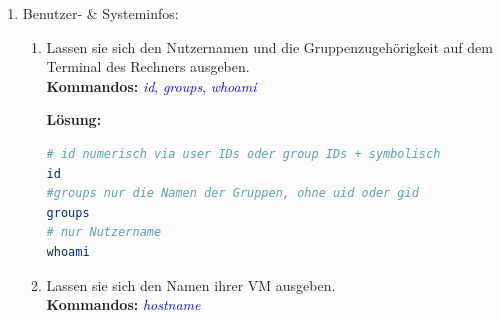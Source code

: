 \documentclass[paper=a4,fontsize=11pt]{scrartcl}%
\numberwithin{equation}{section}
\newenvironment{solution}
	{
		\color{blue}
		\textbf{Lösung:}
	}{}
\begin{document}
\begin{enumerate}
\begin{enumerate}[label=(\alph*)]
		\begin{solution}
        \begin{lstlisting}[style=Bash, language=Bash]
cd
mkdir -p exercise_notes/tutorials
		\end{lstlisting}
		\end{solution}
		\item Kopieren sie die Datei bzw. den Ordner \emph{shell\_tutorial} in das eben angelegte Verzeichnis.\\
		\textbf{Kommandos:} \textcolor{blue}{\emph{cp} }
		
		\begin{solution}
        \begin{lstlisting}[style=Bash, language=Bash]
#kopiere nur Datei
cp shell_tutorial/shell_tutorial.md exercise_notes/tutorials
#Ordner
cp -r shell_tutrial exercise_notes/tutorials
		\end{lstlisting}
		\end{solution}
        \item Kopieren sie die Datei(en) inklusive des Ordners  in das Verzeichnis .\\
        \textbf{Hinweise:} Schauen sie in die Manpage von \emph{cp} um herauszufinden, wie Ordner kopiert werden können.\\
        \textbf{Kommandos:} \textcolor{blue}{\emph{man cp}}
        
		\begin{solution}
        \begin{lstlisting}[style=Bash, language=Bash]
cp -r shell_tutorial /tmp
		\end{lstlisting}
		\end{solution}
  	\end{enumerate}
  	\footnote{.md steht für Markdown, welches ein Format für Textdateien ist, ähnlich wie .pdf oder .doc-Dateien.}
\newpage  
         \item Benutzer- \& Systeminfos:
    		\begin{enumerate} [label=(\alph*)]
          \item Lassen sie sich den Nutzernamen und die Gruppenzugehörigkeit auf dem Terminal des Rechners ausgeben.\\
          \textbf{Kommandos:} \textcolor{blue}{\emph{id}, \emph{groups}, \emph{whoami}}
          
		\begin{solution}
        \begin{lstlisting}[style=Bash, language=Bash]
# id numerisch via user IDs oder group IDs + symbolisch
id
#groups nur die Namen der Gruppen, ohne uid oder gid
groups
# nur Nutzername
whoami
		\end{lstlisting}
		\end{solution}
          \item Lassen sie sich den Namen ihrer VM ausgeben.\\
          \textbf{Kommandos:} \textcolor{blue}{\emph{hostname}}


\end{enumerate}
\end{enumerate}
\end{document}

